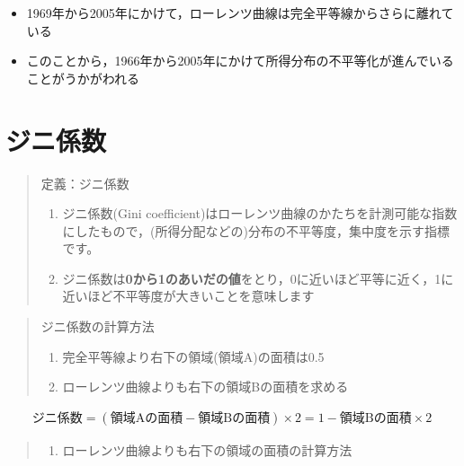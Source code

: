 \documentclass[
]{book}
\providecommand{\tightlist}{%
  \setlength{\itemsep}{0pt}\setlength{\parskip}{0pt}}
\theoremstyle{definition}
\theoremstyle{definition}
\theoremstyle{definition}
\theoremstyle{definition}
\theoremstyle{remark}
\begin{document}
\begin{itemize}
\tightlist
\item
  1969年から2005年にかけて，ローレンツ曲線は完全平等線からさらに離れている
\item
  このことから，1966年から2005年にかけて所得分布の不平等化が進んでいることがうかがわれる
\end{itemize}

\hypertarget{ux30b8ux30cbux4fc2ux6570}{%
\section{ジニ係数}\label{ux30b8ux30cbux4fc2ux6570}}

\begin{quote}
定義：ジニ係数

\begin{enumerate}
\def\labelenumi{\arabic{enumi}.}
\tightlist
\item
  ジニ係数(Gini coefficient)はローレンツ曲線のかたちを計測可能な指数にしたもので，(所得分配などの)分布の不平等度，集中度を示す指標です。
\item
  ジニ係数は\textbf{0から1のあいだの値}をとり，0に近いほど平等に近く，1に近いほど不平等度が大きいことを意味します
\end{enumerate}
\end{quote}

\begin{quote}
ジニ係数の計算方法

\begin{enumerate}
\def\labelenumi{\arabic{enumi}.}
\tightlist
\item
  完全平等線より右下の領域(領域A)の面積は0.5
\item
  ローレンツ曲線よりも右下の領域Bの面積を求める
\end{enumerate}
\end{quote}

\begin{align*}
\text{ジニ係数}
=(\text{領域Aの面積}-\text{領域Bの面積})\times 2
=1-\text{領域Bの面積}\times 2 
\end{align*}

\begin{quote}
\begin{enumerate}
\def\labelenumi{\arabic{enumi}.}
\setcounter{enumi}{2}
\tightlist
\item
  ローレンツ曲線よりも右下の領域の面積の計算方法
\end{enumerate}
\end{quote}
\end{document}
